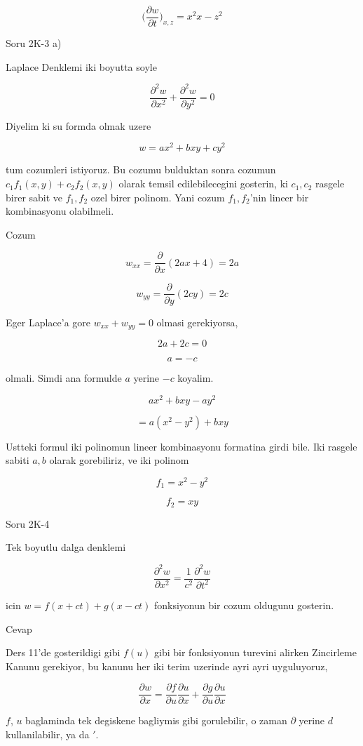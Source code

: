 \documentclass[12pt,fleqn]{article}
\begin{document}
\[ \bigg( \frac{\partial w}{\partial t}  \bigg)_{x,z} = x^2x-z^2 \]

Soru 2K-3 a)

Laplace Denklemi iki boyutta soyle

\[ \frac{\partial^2 w}{\partial x^2} + 
\frac{\partial^2 w}{\partial y^2}  = 0
 \]

Diyelim ki su formda olmak uzere

\[ w = ax^2 + bxy + cy^2 \]

tum cozumleri istiyoruz. Bu cozumu bulduktan sonra cozumun $c_1f_1(x,y) +
c_2f_2(x,y)$ 
olarak temsil edilebilecegini gosterin, ki $c_1,c_2$ rasgele
birer sabit ve $f_1,f_2$ ozel birer polinom. Yani cozum $f_1,f_2$'nin
lineer bir kombinasyonu olabilmeli.

Cozum 

\[ w_{xx} = \frac{\partial }{\partial x} (2ax + 4) = 2a \]

\[ w_{yy} = \frac{\partial }{\partial y} (2cy) = 2c \]

Eger Laplace'a gore $w_{xx} + w_{yy} = 0$ olmasi gerekiyorsa,

\[ 2a + 2c = 0 \]

\[ a = -c \]

olmali. Simdi ana formulde $a$ yerine $-c$ koyalim. 

\[ ax^2 + bxy -ay^2 \]

\[ = a(x^2-y^2) + bxy \]

Ustteki formul iki polinomun lineer kombinasyonu formatina girdi bile. Iki
rasgele sabiti $a,b$ olarak gorebiliriz, ve iki polinom

\[ f_1 = x^2-y^2 \]

\[ f_2 = xy \]

Soru 2K-4

Tek boyutlu dalga denklemi 

\[ \frac{\partial ^2w}{\partial x^2} = \frac{ 1}{c^2} 
\frac{\partial ^2w}{\partial t^2} \]

icin $w = f(x+ct) + g(x-ct)$ fonksiyonun bir cozum oldugunu gosterin. 

Cevap 

Ders 11'de gosterildigi gibi $f(u)$ gibi bir fonksiyonun turevini alirken
Zincirleme Kanunu gerekiyor, bu kanunu her iki terim uzerinde ayri ayri
uyguluyoruz,

\[ \frac{\partial w}{\partial x}  = 
\frac{\partial f}{\partial u}
\frac{\partial u}{\partial x} + 
\frac{\partial g}{\partial u}
\frac{\partial u}{\partial x} 
\]

$f$, $u$ baglaminda tek degiskene bagliymis gibi gorulebilir, o zaman
$\partial$ yerine $d$ kullanilabilir, ya da $'$. 
\end{document}
